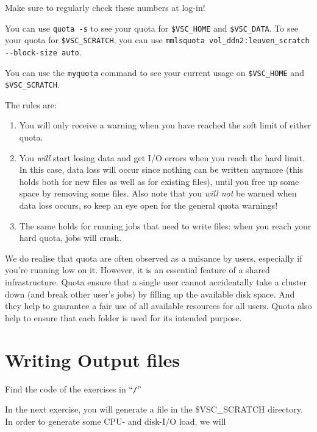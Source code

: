 Make sure to regularly check these numbers at log-in!
\fi

\ifleuven
You can use \lstinline|quota -s| to see your quota for \lstinline|$VSC_HOME| and \lstinline|$VSC_DATA|.
To see your quota for \lstinline|$VSC_SCRATCH|, you can use \lstinline|mmlsquota vol_ddn2:leuven_scratch --block-size auto|.
\fi

\ifbrussel
You can use the \lstinline|myquota| command to see your current usage on \lstinline|$VSC_HOME| and \lstinline|$VSC_SCRATCH|.
\fi

The rules are:
\begin{enumerate}
\item  You will only receive a warning when you have reached the soft limit of either quota.
\item  You \emph{will} start losing data and get I/O errors when you reach the hard limit. In this
  case, data loss will occur  since nothing can be written anymore (this holds
  both for new files as well as for existing files), until you free up
  some space by removing some files. Also note that you \emph{will not} be
  warned when data loss occurs, so keep an eye open for the general quota
  warnings!
\item  The same holds for running jobs that need to write files: when you reach
  your hard quota, jobs will crash.
\end{enumerate}

We do realise that quota are often observed as a nuisance by users, especially if you're running low on it.
However, it is an essential feature of a shared infrastructure. Quota ensure that a single user cannot
accidentally take a cluster down (and break other user's jobs) by filling up the available disk space.
And they help to guarantee a fair use of all available resources for all users. Quota also help to ensure
that each folder is used for its intended purpose.

\section{Writing Output files}

\begin{tip}
Find the code of the exercises in ``\texttt{\tilde/\exampledir}''
\end{tip}

In the next exercise, you will generate a file in the \$VSC\_SCRATCH directory.
In order to generate some CPU- and disk-I/O load, we will

